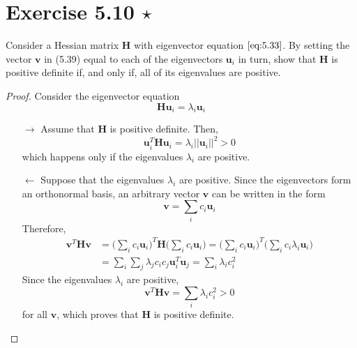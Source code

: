 \section*{Exercise 5.10 $\star$}
Consider a Hessian matrix $\mathbf{H}$ with eigenvector equation $\eqref{eq:5.33}$. By
setting the vector $\mathbf{v}$ in (5.39) equal to each of the eigenvectors
$\mathbf{u}_i$ in turn, show that $\mathbf{H}$ is positive definite if,
and only if, all of its eigenvalues are positive.

\vspace{1em}

\begin{proof}
    Consider the eigenvector equation
    \begin{equation*}
        \mathbf{H}\mathbf{u}_i = \lambda_i \mathbf{u}_i
        \tag{5.33}\label{eq:5.33}
    \end{equation*}
    \begin{enumerate}
        \item [$\to$] Assume that $\mathbf{H}$ is positive definite. Then,
    \[
        \mathbf{u}_i^T \mathbf{H} \mathbf{u}_i = \lambda_i ||\mathbf{u}_i||^2 > 0
    \] 
    which happens only if the eigenvalues $\lambda_i$ are positive.
    \vspace{1em}
    \item [$\leftarrow$] Suppose that the eigenvalues $\lambda_i$ are positive.
        Since the eigenvectors form an orthonormal basis, an arbitrary
        vector $\mathbf{v}$ can be written in the form
        \begin{equation*}
            \mathbf{v} = \sum_{i} c_i \mathbf{u}_i 
            \tag{5.38}\label{eq:5.38}
        \end{equation*}
        Therefore, 
        \begin{align*}
            \mathbf{v}^T\mathbf{H}\mathbf{v}
            &= \bigg(\sum_{i} c_i \mathbf{u}_i\bigg)^T \mathbf{H}
            \bigg(\sum_{i} c_i \mathbf{u}_i\bigg)
            = \bigg(\sum_{i} c_i \mathbf{u}_i\bigg)^T
            \bigg(\sum_{i} c_i \lambda_i \mathbf{u}_i\bigg) \\
            &= \sum_{i} \sum_{j} \lambda_j c_i c_j \mathbf{u}_i^T \mathbf{u}_j
            = \sum_{i} \lambda_i c_i^2
        \end{align*}
        Since the eigenvalues $\lambda_i$ are positive,
        \[
            \mathbf{v}^T\mathbf{H}\mathbf{v} = \sum_{i} \lambda_i c_i^2 > 0
        \] 
        for all $\mathbf{v}$, which proves that $\mathbf{H}$ is positive definite.
    \end{enumerate}
\end{proof}

